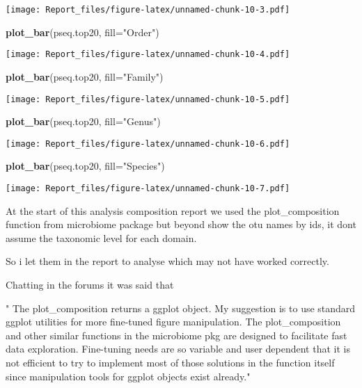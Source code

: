 \documentclass[]{article}
\newenvironment{Shaded}{\begin{snugshade}}{\end{snugshade}}
\newcommand{\DataTypeTok}[1]{\textcolor[rgb]{0.13,0.29,0.53}{#1}}
\newcommand{\KeywordTok}[1]{\textcolor[rgb]{0.13,0.29,0.53}{\textbf{#1}}}
\newcommand{\NormalTok}[1]{#1}
\newcommand{\StringTok}[1]{\textcolor[rgb]{0.31,0.60,0.02}{#1}}
\begin{document}
\texttt{[image: Report\_files/figure-latex/unnamed-chunk-10-3.pdf]}

\begin{Shaded}
\begin{Highlighting}[]
\KeywordTok{plot_bar}\NormalTok{(pseq.top20, }\DataTypeTok{fill=}\StringTok{"Order"}\NormalTok{)}
\end{Highlighting}
\end{Shaded}

\texttt{[image: Report\_files/figure-latex/unnamed-chunk-10-4.pdf]}

\begin{Shaded}
\begin{Highlighting}[]
\KeywordTok{plot_bar}\NormalTok{(pseq.top20, }\DataTypeTok{fill=}\StringTok{"Family"}\NormalTok{)}
\end{Highlighting}
\end{Shaded}

\texttt{[image: Report\_files/figure-latex/unnamed-chunk-10-5.pdf]}

\begin{Shaded}
\begin{Highlighting}[]
\KeywordTok{plot_bar}\NormalTok{(pseq.top20, }\DataTypeTok{fill=}\StringTok{"Genus"}\NormalTok{)}
\end{Highlighting}
\end{Shaded}

\texttt{[image: Report\_files/figure-latex/unnamed-chunk-10-6.pdf]}

\begin{Shaded}
\begin{Highlighting}[]
\KeywordTok{plot_bar}\NormalTok{(pseq.top20, }\DataTypeTok{fill=}\StringTok{"Species"}\NormalTok{)}
\end{Highlighting}
\end{Shaded}

\texttt{[image: Report\_files/figure-latex/unnamed-chunk-10-7.pdf]}

At the start of this analysis composition report we used the
plot\_composition function from microbiome package but beyond show the
otu names by ids, it dont assume the taxonomic level for each domain.

So i let them in the report to analyse which may not have worked
correctly.

Chatting in the forums it was said that

" The plot\_composition returns a ggplot object. My suggestion is to use
standard ggplot utilities for more fine-tuned figure manipulation. The
plot\_composition and other similar functions in the microbiome pkg are
designed to facilitate fast data exploration. Fine-tuning needs are so
variable and user dependent that it is not efficient to try to implement
most of those solutions in the function itself since manipulation tools
for ggplot objects exist already."
\end{document}
